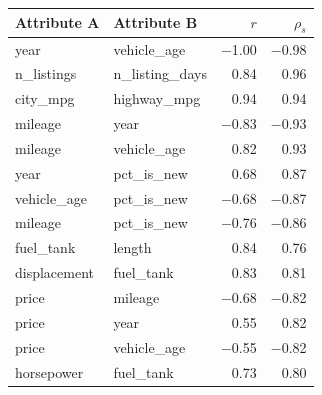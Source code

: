 \begin{tabular}{@{}llrr@{}}
\toprule
Attribute A & Attribute B & $r$ & $\rho_s$ \\
\midrule
year & vehicle\_age & $-$1.00 & $-$0.98 \\
n\_listings & n\_listing\_days & 0.84 & 0.96 \\
city\_mpg & highway\_mpg & 0.94 & 0.94 \\
mileage & year & $-$0.83 & $-$0.93 \\
mileage & vehicle\_age & 0.82 & 0.93 \\
year & pct\_is\_new & 0.68 & 0.87 \\
vehicle\_age & pct\_is\_new & $-$0.68 & $-$0.87 \\
mileage & pct\_is\_new & $-$0.76 & $-$0.86 \\
fuel\_tank & length & 0.84 & 0.76 \\
displacement & fuel\_tank & 0.83 & 0.81 \\
price & mileage & $-$0.68 & $-$0.82 \\
price & year & 0.55 & 0.82 \\
price & vehicle\_age & $-$0.55 & $-$0.82 \\
horsepower & fuel\_tank & 0.73 & 0.80 \\
\bottomrule
\end{tabular}
